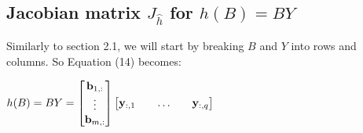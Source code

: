 \documentclass{article}
\begin{document}
\subsection{Jacobian matrix $J_{\widehat{h}}$ for $h(B)=BY$}
Similarly to section 2.1, we will start by breaking $B$ and $Y$ into rows and columns. So Equation (14) becomes:

\begin{center}$
h(B) = BY = \begin{bmatrix} \mathbf{b}_{1,:} \\ \vdots \\ \mathbf{b}_{m,:} \end{bmatrix} 
\begin{bmatrix} \mathbf{y}_{:,1} && \hdots && \mathbf{y}_{:,q} \end{bmatrix} \\$
\end{center}
\end{document}
